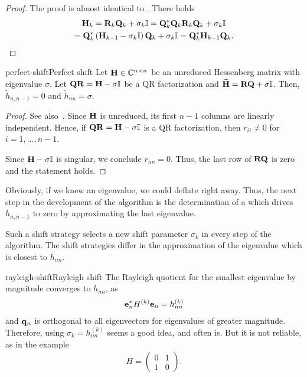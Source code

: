 \begin{proof}
  The proof is almost identical to . There holds
  \begin{multline}
    \mathbf H_k = \mathbf R_k\mathbf Q_k + \sigma_k \mathbb I
    = \mathbf Q_k^*\mathbf Q_k\mathbf R_k\mathbf Q_k + \sigma_k \mathbb I\\
    =\mathbf Q_k^*\left(\mathbf H_{k-1}-\sigma_k\mathbb I\right)\mathbf Q_k + \sigma_k \mathbb I
    =\mathbf Q_k^*\mathbf H_{k-1}\mathbf Q_k.
  \end{multline}
\end{proof}

\begin{Lemma*}{perfect-shift}{Perfect shift}
  Let $\mathbf H\in\mathbb C^{n\times n}$ be an unreduced Hessenberg matrix with eigenvalue
  $\sigma$. Let $\mathbf Q\mathbf R = \mathbf H - \sigma\mathbb I$ be a QR factorization
  and $\widetilde{\mathbf H} = \mathbf R\mathbf Q+\sigma\mathbb I$. Then,
  $\tilde h_{n,n-1}=0$ and $\tilde h_{nn} =\sigma$.
\end{Lemma*}

\begin{proof}
  See also~\cite[Theorem 7.5.1]{GolubVanLoan83}.  Since $\mathbf H$ is
  unreduced, its first $n-1$ columns are linearly independent. Hence,
  if $\mathbf Q\mathbf R=\mathbf H-\sigma\mathbb I$ is a QR factorization, then
  $r_{ii} \neq 0$ for $i=1,\dots,n-1$.

  Since $\mathbf H-\sigma\mathbb I$ is singular, we conclude $r_{nn}=0$. Thus,
  the last row of $\mathbf R\mathbf Q$ is zero and the statement holds.
\end{proof}

\begin{intro}
  Obviously, if we knew an eigenvalue, we could deflate right
  away. Thus, the next step in the development of the algorithm is the
  determination of a  which drives $h_{n,n-1}$
  to zero by approximating the last eigenvalue.

  Such a shift strategy selects a new shift parameter $\sigma_k$ in
  every step of the algorithm. The shift strategies differ in the
  approximation of the eigenvalue which is closest to $h_{nn}$.
\end{intro}

\begin{Example*}{rayleigh-shift}{Rayleigh shift}
  The Rayleigh quotient for the smallest eigenvalue by magnitude
  converges to $h_{nn}$, as
  \begin{gather}
    \mathbf e_n^* H^{(k)} \mathbf e_n = h_{nn}^{(k)}
  \end{gather}
  and $\mathbf q_n$ is orthogonal to all eigenvectors for eigenvalues of
  greater magnitude. Therefore, using $\sigma_k = h_{nn}^{(k)}$ seems
  a good idea, and often is. But it is not reliable, as in the example
  \begin{gather}
    H =
    \begin{pmatrix}
      0 & 1 \\ 1 & 0
    \end{pmatrix}.
  \end{gather}
\end{Example*}

